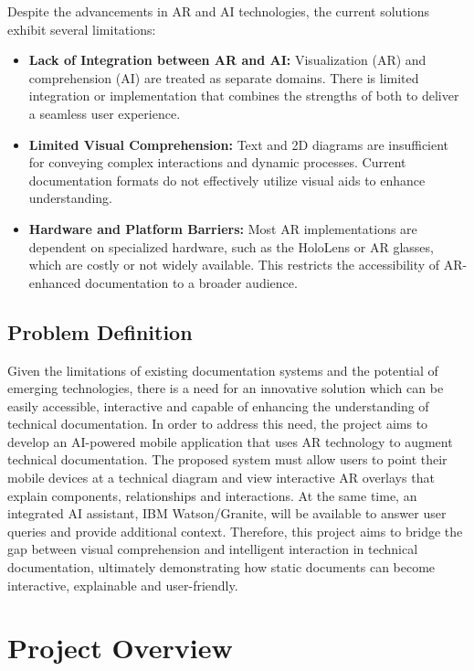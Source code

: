 \documentclass[12pt]{article}
\begin{document}
        Despite the advancements in AR and AI technologies, the current solutions exhibit several limitations:
        \begin{itemize}
            \item \textbf{Lack of Integration between AR and AI:}
                Visualization (AR) and comprehension (AI) are treated as separate domains. There is limited integration or implementation that combines the strengths of both to deliver a seamless user experience.
            \item \textbf{Limited Visual Comprehension:}
                Text and 2D diagrams are insufficient for conveying complex interactions and dynamic processes. Current documentation formats do not effectively utilize visual aids to enhance understanding.
            \item \textbf{Hardware and Platform Barriers:}
                Most AR implementations are dependent on specialized hardware, such as the HoloLens or AR glasses, which are costly or not widely available. This restricts the accessibility of AR-enhanced documentation to a broader audience.
        \end{itemize}

    \subsection{Problem Definition}

    Given the limitations of existing documentation systems and the potential of emerging technologies, there is a need for an innovative solution which can be easily accessible, interactive and capable of enhancing
    the understanding of technical documentation. In order to address this need, the project aims to develop an AI-powered mobile application that uses AR technology to augment technical documentation. The proposed system must 
    allow users to point their mobile devices at a technical diagram and view interactive AR overlays that explain components, relationships and interactions. At the same time, an integrated AI assistant, IBM Watson/Granite,
    will be available to answer user queries and provide additional context. Therefore, this project aims to bridge the gap between visual comprehension and intelligent interaction in technical documentation, ultimately demonstrating how static documents can become interactive, explainable and user-friendly.


\section{Project Overview}
\end{document}
